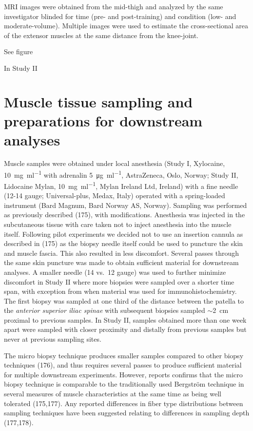 \documentclass[twoside,10pt]{gihclass} %
\begin{document}
MRI images were obtained from the mid-thigh and analyzed by the same
investigator blinded for time (pre- and post-training) and condition
(low- and moderate-volume). Multiple images were used to estimate the
cross-sectional area of the extensor muscles at the same distance from
the knee-joint.

See figure

In Study II

\hypertarget{muscle-tissue-sampling-and-preparations-for-downstream-analyses}{%
\section{Muscle tissue sampling and preparations for downstream analyses}\label{muscle-tissue-sampling-and-preparations-for-downstream-analyses}}

Muscle samples were obtained under local anesthesia (Study I, Xylocaine,
\SI{10}{\mg\per\ml} with adrenalin \SI{5}{\micro\gram\per\ml},
AstraZeneca, Oslo, Norway; Study II, Lidocaine Mylan,
\SI{10}{\mg\per\ml}, Mylan Ireland Ltd, Ireland) with a fine needle
(12-14 gauge; Universal-plus, Medax, Italy) operated with a
spring-loaded instrument (Bard Magnum, Bard Norway AS, Norway). Sampling
was performed as previously described
(175), with
modifications. Anesthesia was injected in the subcutaneous tissue with
care taken not to inject anesthesia into the muscle itself. Following
pilot experiments we decided not to use an insertion cannula as
described in (175) as the biopsy needle itself could be used to
puncture the skin and muscle fascia. This also resulted in less
discomfort. Several passes through the same skin puncture was made to
obtain sufficient material for downstream analyses. A smaller needle (14
vs.~12 gauge) was used to further minimize discomfort in Study II where
more biopsies were sampled over a shorter time span, with exception from
when material was used for immunohistochemistry. The first biopsy was
sampled at one third of the distance between the patella to the
\emph{anterior superior iliac spinae} with subsequent biopsies sampled
\(\sim\)\SI{2}{cm} proximal to previous samples. In Study II, samples
obtained more than one week apart were sampled with closer proximity and
distally from previous samples but never at previous sampling sites.

The micro biopsy technique produces smaller samples compared to other
biopsy techniques
(176), and thus
requires several passes to produce sufficient material for multiple
downstream experiments. However, reports confirms that the micro biopsy
technique is comparable to the traditionally used Bergström technique in
several measures of muscle characteristics at the same time as being
well tolerated (175,177). Any reported differences in fiber type
distributions between sampling techniques have been suggested relating
to differences in sampling depth (177,178).
\end{document}
